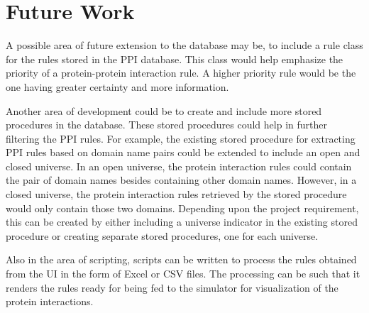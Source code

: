 \documentclass[msc,deptreport,ai]{infthesis}      %
\begin{document}
\section{Future Work}
A possible area of future extension to the database may be, to include a rule class for the rules stored in the PPI database. This class would help emphasize the priority of a protein-protein interaction rule. A higher priority rule would be the one having greater certainty and more information.

Another area of development could be to create and include more stored procedures in the database. These stored procedures could help in further filtering the PPI rules. For example, the existing stored procedure for extracting PPI rules based on domain name pairs could be extended to include an open and closed universe. In an open universe, the protein interaction rules could contain the pair of domain names besides containing other domain names. However, in a closed universe, the protein interaction rules retrieved by the stored procedure would only contain those two domains. Depending upon the project requirement, this can be created by either including a universe indicator in the existing stored procedure or creating separate stored procedures, one for each universe.

Also in the area of scripting, scripts can be written to process the rules obtained from the UI in the form of Excel or CSV files. The processing can be such that it renders the rules ready for being fed to the simulator for visualization of the protein interactions.




\end{document}
